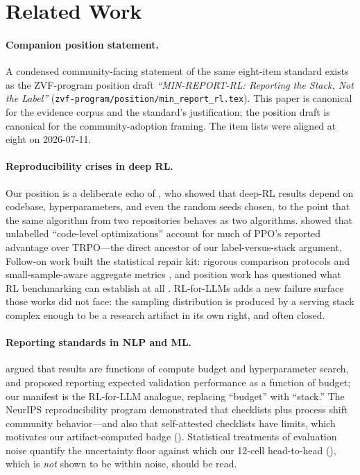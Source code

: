 \section{Related Work}
\label{sec:p5-related}

\paragraph{Companion position statement.} A condensed community-facing
statement of the same eight-item standard exists as the ZVF-program
position draft \emph{``MIN-REPORT-RL: Reporting the Stack, Not the
Label''} (\texttt{zvf-program/position/min\_report\_rl.tex}). This paper
is canonical for the evidence corpus and the standard's justification;
the position draft is canonical for the community-adoption framing. The
item lists were aligned at eight on 2026-07-11.

\paragraph{Reproducibility crises in deep RL.} Our position is a deliberate
echo of \citet{henderson2018deep}, who showed that deep-RL results depend on
codebase, hyperparameters, and even the random seeds chosen, to the point
that the same algorithm from two repositories behaves as two algorithms.
\citet{engstrom2020implementation} showed that unlabelled ``code-level
optimizations'' account for much of PPO's reported advantage over TRPO---the
direct ancestor of our label-versus-stack argument.
Follow-on work built the statistical repair kit: rigorous comparison
protocols \citep{colas2019hitchhiker} and small-sample-aware aggregate
metrics \citep{agarwal2021deep}, and position work has questioned what RL
benchmarking can establish at all \citep{jordan2024benchmarking}. RL-for-LLMs
adds a new failure surface those works did not face: the sampling
distribution is produced by a serving stack complex enough to be a research
artifact in its own right, and often closed.

\paragraph{Reporting standards in NLP and ML.} \citet{dodge2019show} argued
that results are functions of compute budget and hyperparameter search, and
proposed reporting expected validation performance as a function of budget;
our manifest is the RL-for-LLM analogue, replacing ``budget'' with ``stack.''
The NeurIPS reproducibility program \citep{pineau2020improving} demonstrated
that checklists plus process shift community behavior---and also that
self-attested checklists have limits, which motivates our artifact-computed
badge (). Statistical treatments of evaluation
noise \citep{miller2024erroreval, zhang2024benchvariance} quantify the
uncertainty floor against which our 12-cell head-to-head
(), which is \emph{not} shown to be within noise,
should be read.

